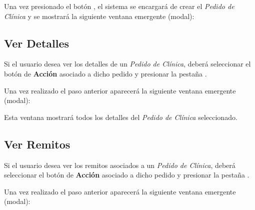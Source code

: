 \documentclass[a4paper,10pt,spanish]{sphinxmanual}
\begin{document}
Una vez presionado el botón , el sistema se encargará de crear el \emph{Pedido de Clínica} y se mostrará la siguiente ventana emergente (modal):



\subsection{Ver Detalles}
\label{pedidosclinica:ver-detalles-pc}\label{pedidosclinica:ver-detalles}
Si el usuario desea ver los detalles de un \emph{Pedido de Clínica}, deberá seleccionar el botón de \textbf{Acción} asociado a dicho pedido y presionar la pestaña .


Una vez realizado el paso anterior aparecerá la siguiente ventana emergente (modal):


Esta ventana mostrará todos los detalles del \emph{Pedido de Clínica} seleccionado.


\subsection{Ver Remitos}
\label{pedidosclinica:ver-remitos}\label{pedidosclinica:ver-remitos-pc}
Si el usuario desea ver los remitos asociados a un \emph{Pedido de Clínica}, deberá seleccionar el botón de \textbf{Acción} asociado a dicho pedido y presionar la pestaña .


Una vez realizado el paso anterior aparecerá la siguiente ventana emergente (modal):

\end{document}
